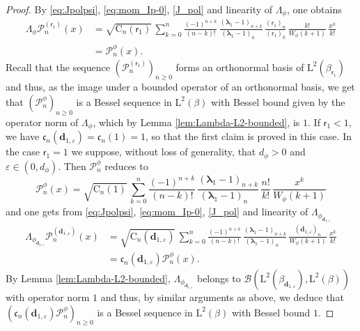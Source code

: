 \documentclass[10pt]{amsart}
\let\epsilon\varepsilon
\theoremstyle{plain}
\theoremstyle{definition}
\renewcommand{\P}{\mathcal{P}}
\newcommand{\C}{{\mathrm{C}}}
\newcommand{\Leb}{\mathrm{L}}
\newcommand{\dz}{{\bm{d}}_{1,\epsilon}}
\newcommand{\Bop}[2]{\mathcal{B}(#1,#2)}
\newcommand{\lam}{{\bm{\lambda}_1}}
\newcommand{\vat}{{\mathsf{r}_1}}
\newcommand{\gab}[1][\lam,\mo]{{\beta_{#1}}}
\let\mo\mu
\let\bpsi\beta
\begin{document}
\begin{proof}
By \eqref{eq:Jpolpsi}, \eqref{eq:mom_Ip-0}, \eqref{J_pol} and linearity of $\Lambda_{\phi}$, one obtains
\begin{equation}
\label{eq:LambdaP}
\begin{split}
\Lambda_\phi \P_n^{(\vat)}(x) &= \sqrt{\C_n(\vat)}\, \sum_{k=0}^n \frac{(-1)^{n+k}}{(n-k)!}\, \frac{(\lam-1)_{n+k}}{(\lam-1)_{n\phantom{+k}}}\, \frac{(\vat)_n}{(\vat)_k}\, \frac{k!}{W_\phi(k+1)}\, \frac{x^k}{k!}\\
&= \P_n^\phi(x).
\end{split}
\end{equation}
Recall that the sequence $(\P_n^{(\vat)})_{n \geq 0}$ forms an orthonormal basis of $\Leb^2(\gab[\vat])$ and thus, as the image under a bounded operator of an orthonormal basis, we get that $(\P_n^\phi)_{n \geq 0}$ is a Bessel sequence in $\Leb^2(\bpsi)$ with Bessel bound given by the operator norm of $\Lambda_\phi$, which by Lemma \ref{lem:Lambda-L2-bounded}, is $1$. If $\vat <1$, we have $\mathfrak{c}_n(\dz) = \mathfrak{c}_n(1) =1$, so that the first claim is proved in this case. In the case $\vat = 1$ we suppose, without loss of generality, that $d_\phi > 0$ and $\epsilon \in (0,d_\phi)$. Then $\P_n^\phi$ reduces to
\begin{equation*}
\P_n^\phi(x) = \sqrt{\C_n(1)}\, \sum_{k=0}^n \frac{(-1)^{n+k}}{(n-k)!} \,\frac{(\lam-1)_{n+k}}{(\lam-1)_{n\phantom{+k}}}\, \frac{n!}{k!}\, \frac{x^k}{W_{\phi}(k+1)}
\end{equation*}
and one gets from \eqref{eq:Jpolpsi}, \eqref{eq:mom_Ip-0}, \eqref{J_pol} and linearity of $\Lambda_{\phi_{\dz}}$
\begin{align*}
\Lambda_{\phi_{\dz}} \P_n^{(\dz)} (x)
&= \sqrt{\C_n(\dz)}\, \sum_{k=0}^n \frac{(-1)^{n+k}}{(n-k)!}\, \frac{(\lam-1)_{n+k}}{(\lam-1)_{n\phantom{+k}}} \,\frac{(\dz)_n}{W_\phi(k+1)}\, \frac{x^k}{k!}\\
&= \mathfrak{c}_n(\dz)\P^{\phi}_n(x).
\end{align*}
By Lemma \ref{lem:Lambda-L2-bounded}, $\Lambda_{\phi_{\dz}}$ belongs to $\Bop{\Leb^2(\gab[\dz])}{\Leb^2(\bpsi)}$ with operator norm $1$ and thus, by similar arguments as above, we deduce that $(\mathfrak{c}_n(\dz)\P^{\phi}_n)_{n \geq 0}$ is a Bessel sequence in $\Leb^2(\bpsi)$ with Bessel bound $1$.


\end{proof}
\end{document}
